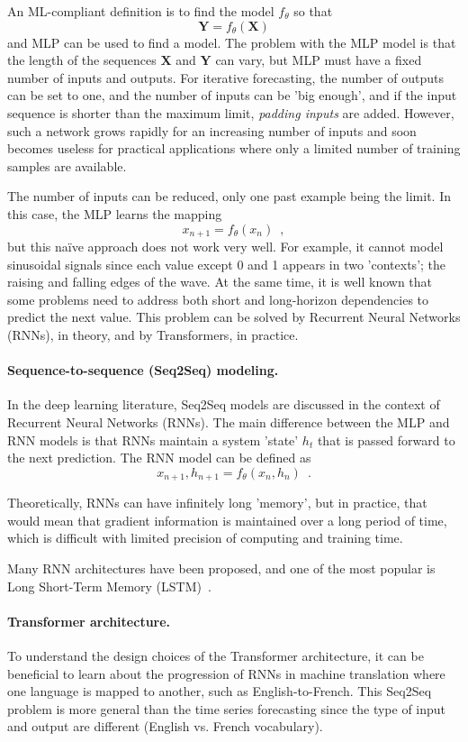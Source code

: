\documentclass[final]{article}
\begin{document}
An ML-compliant definition is to find the model $f_\theta$ so that
\[
\mathbf{Y} = f_\theta (\mathbf{X}) 
\]
and MLP can be used to find a model. The problem with the MLP model is
that the length of the sequences $\mathbf{X}$ and $\mathbf{Y}$ can vary,
but MLP must have a fixed number of inputs and outputs. For iterative
forecasting, the number of outputs can be set to one, and the number
of inputs can be 'big enough', and if the input sequence is
shorter than the maximum limit, \textit{padding inputs} are added.
However, such a network grows rapidly for an increasing number of
inputs and soon becomes useless for practical applications where only
a limited number of training samples are available.

The number of inputs can be reduced, only one past example being the
limit. In this case, the MLP learns the mapping
\[
x_{n+1} = f_\theta (x_{n}) \enspace ,
\]
but this naïve approach does not work very well. For example, it
cannot model sinusoidal signals since each value except 0 and 1
appears in two ’contexts'; the raising and falling edges of the wave.
At the same time, it is well known that some problems need to address
both short and long-horizon dependencies to predict the next value.
This problem can be solved by Recurrent Neural Networks (RNNs), in
theory, and by Transformers, in practice.


\paragraph{Sequence-to-sequence (Seq2Seq) modeling.}
In the deep learning literature, Seq2Seq models are discussed in the context of
Recurrent Neural Networks (RNNs). The main difference between the MLP
and RNN models is that RNNs maintain a system 'state' $h_t$ that is
passed forward to the next prediction. The RNN model can be
defined as
\[
x_{n+1},h_{n+1} = f_\theta (x_{n},h_{n}) \enspace .
\]

Theoretically, RNNs can have infinitely long 'memory', but in practice,
that would mean that gradient information is maintained over a
long period of time, which is difficult with limited precision of computing 
and training time. 

Many RNN architectures have been proposed, and one of the most popular
is Long Short-Term Memory (LSTM)~\cite{LSTM}.


\paragraph{Transformer architecture.}
To understand the design choices of the Transformer architecture, it
can be beneficial to learn about the progression of RNNs in machine
translation where one language is mapped to another, such as
English-to-French. This Seq2Seq problem is more general than the
time series forecasting since the type of input and output are
different (English vs. French vocabulary).
\end{document}
